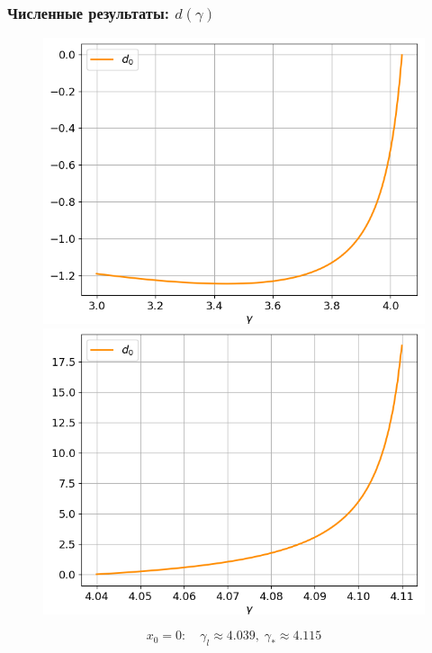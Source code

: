 \documentclass[fullscreen=true, unicode, bookmarks=false]{beamer}
\begin{document}
\begin{frame}
\frametitle{ Численные результаты: $ d(\gamma) $ }

\begin{figure} 
\includegraphics[scale=0.37]{divergent_d0_before_0.png}  
\hfill
\includegraphics[scale=0.37]{divergent_d0_after_0.png}  
\end{figure}

$$ x_0 = 0: \quad \gamma_l \approx 4.039, \; \gamma_* \approx 4.115 $$

\end{frame}
\end{document}
